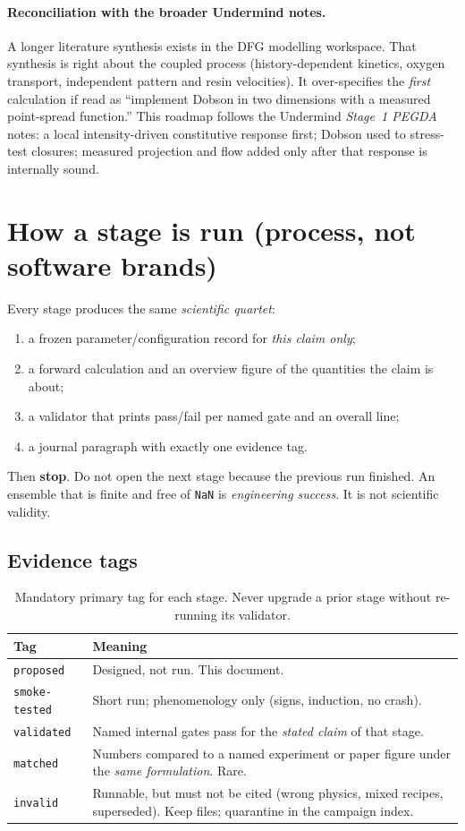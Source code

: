\documentclass[11pt,a4paper]{article}
\newcommand{\tagproposed}{\texttt{proposed}}
\newcommand{\tagsmoke}{\texttt{smoke-tested}}
\newcommand{\tagvalid}{\texttt{validated}}
\newcommand{\tagmatch}{\texttt{matched}}
\newcommand{\taginvalid}{\texttt{invalid}}
\begin{document}
\paragraph{Reconciliation with the broader Undermind notes.}
A longer literature synthesis exists in the DFG modelling workspace.
That synthesis is right about the coupled process (history-dependent kinetics, oxygen transport, independent pattern and resin velocities).
It over-specifies the \emph{first} calculation if read as ``implement Dobson in two dimensions with a measured point-spread function.''
This roadmap follows the Undermind \emph{Stage~1 PEGDA} notes: a local intensity-driven constitutive response first; Dobson used to stress-test closures; measured projection and flow added only after that response is internally sound.

\section{How a stage is run (process, not software brands)}

Every stage produces the same \emph{scientific quartet}:
\begin{enumerate}
  \item a frozen parameter/configuration record for \emph{this claim only};
  \item a forward calculation and an overview figure of the quantities the claim is about;
  \item a validator that prints pass/fail per named gate and an overall line;
  \item a journal paragraph with exactly one evidence tag.
\end{enumerate}
Then \textbf{stop}.
Do not open the next stage because the previous run finished.
An ensemble that is finite and free of \texttt{NaN} is \emph{engineering success}.
It is not scientific validity.

\subsection{Evidence tags}

\begin{table}[htbp]
\centering
\caption{Mandatory primary tag for each stage.
Never upgrade a prior stage without re-running its validator.}
\label{tab:tags}
\small
\begin{tabularx}{\textwidth}{@{}lX@{}}
\toprule
Tag & Meaning \\
\midrule
\tagproposed & Designed, not run. This document. \\
\tagsmoke & Short run; phenomenology only (signs, induction, no crash). \\
\tagvalid & Named internal gates pass for the \emph{stated claim} of that stage. \\
\tagmatch & Numbers compared to a named experiment or paper figure under the \emph{same formulation}. Rare. \\
\taginvalid & Runnable, but must not be cited (wrong physics, mixed recipes, superseded). Keep files; quarantine in the campaign index. \\
\bottomrule
\end{tabularx}
\end{table}
\end{document}
